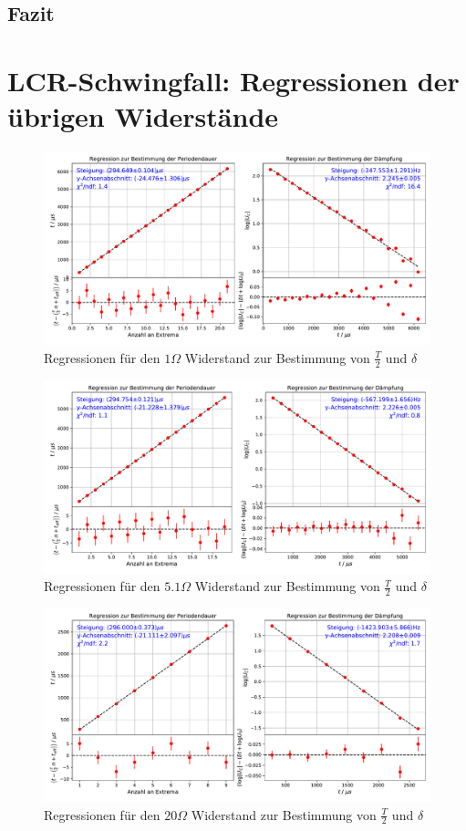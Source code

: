 \documentclass[a4paper, 12pt]{scrartcl}
\begin{document}
\subsection{Fazit}

\newpage
\appendix
\section{LCR-Schwingfall: Regressionen der übrigen Widerstände}\label{app:reg}
\begin{figure}[H]
\centering
\includegraphics[width=\textwidth]{plots/reg_schwingung1.pdf}
\caption{Regressionen für den $1\Omega$ Widerstand zur Bestimmung von $\frac{T}{2}$ und $\delta$}
\end{figure}
\begin{figure}[H]
\centering
\includegraphics[width=\textwidth]{plots/reg_schwingung2.pdf}
\caption{Regressionen für den $5.1\Omega$ Widerstand zur Bestimmung von $\frac{T}{2}$ und $\delta$}
\end{figure}
\begin{figure}[H]
\centering
\includegraphics[width=\textwidth]{plots/reg_schwingung4.pdf}
\caption{Regressionen für den $20\Omega$ Widerstand zur Bestimmung von $\frac{T}{2}$ und $\delta$}
\end{figure}
\end{document}
